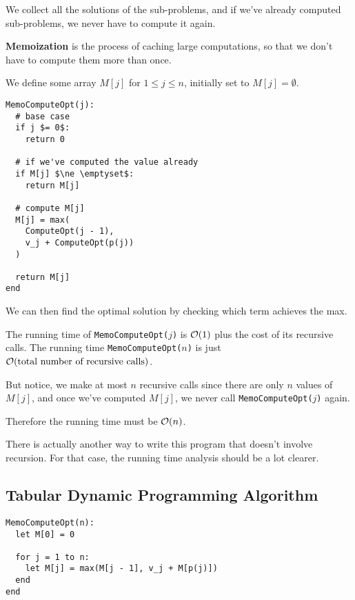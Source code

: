 \documentclass[12pt]{article}
\begin{document}
  We collect all the solutions of the sub-problems, and if we've already computed
  sub-problems, we never have to compute it again.

   {
    {\bf Memoization} is the process of caching large computations, so that we don't
    have to compute them more than once.
  }

  We define some array $M[j]$ for $1 \le j \le n$, initially set to $M[j] =
  \emptyset$.

  \begin{lstlisting}
MemoComputeOpt(j):
  # base case
  if j $= 0$:
    return 0

  # if we've computed the value already
  if M[j] $\ne \emptyset$:
    return M[j]

  # compute M[j]
  M[j] = max(
    ComputeOpt(j - 1),
    v_j + ComputeOpt(p(j))
  )

  return M[j]
end
  \end{lstlisting}

  We can then find the optimal solution by checking which term achieves the max.

  {
    The running time of \texttt{MemoComputeOpt($j$)} is $\mathcal O(1)$ plus the cost of
    its recursive calls. The running time \texttt{MemoComputeOpt($n$)} is just
    $\mathcal O(\text{total number of recursive calls})$.

    But notice, we make at most $n$ recursive calls since there are only $n$
    values of $M[j]$, and once we've computed $M[j]$, we never call
    \texttt{MemoComputeOpt($j$)} again.

    Therefore the running time must be $\mathcal O(n)$.
  }

  There is actually another way to write this program that doesn't involve
  recursion. For that case, the running time analysis should be a lot clearer.

  \subsection{Tabular Dynamic Programming Algorithm}

  \begin{lstlisting}
MemoComputeOpt(n):
  let M[0] = 0

  for j = 1 to n:
    let M[j] = max(M[j - 1], v_j + M[p(j)])
  end
end
  \end{lstlisting}

\end{document}
